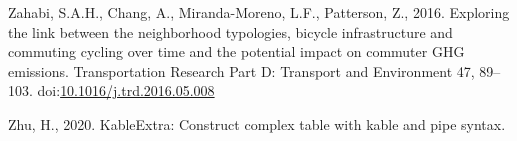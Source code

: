 \documentclass[]{elsarticle} %
\begin{document}
\leavevmode\hypertarget{ref-zahabiExploringLinkNeighborhood2016b}{}%
Zahabi, S.A.H., Chang, A., Miranda-Moreno, L.F., Patterson, Z., 2016.
Exploring the link between the neighborhood typologies, bicycle
infrastructure and commuting cycling over time and the potential impact
on commuter GHG emissions. Transportation Research Part D: Transport and
Environment 47, 89--103.
doi:\href{https://doi.org/10.1016/j.trd.2016.05.008}{10.1016/j.trd.2016.05.008}

\leavevmode\hypertarget{ref-R-kableExtra}{}%
Zhu, H., 2020. KableExtra: Construct complex table with kable and pipe
syntax.
\end{document}
